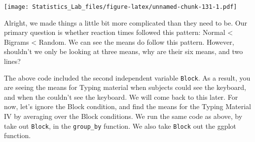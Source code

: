 \documentclass[
]{book}
\newenvironment{Shaded}{\begin{snugshade}}{\end{snugshade}}
\newcommand{\AttributeTok}[1]{\textcolor[rgb]{0.13,0.29,0.53}{#1}}
\newcommand{\CommentTok}[1]{\textcolor[rgb]{0.56,0.35,0.01}{\textit{#1}}}
\newcommand{\DecValTok}[1]{\textcolor[rgb]{0.00,0.00,0.81}{#1}}
\newcommand{\DocumentationTok}[1]{\textcolor[rgb]{0.56,0.35,0.01}{\textbf{\textit{#1}}}}
\newcommand{\FunctionTok}[1]{\textcolor[rgb]{0.13,0.29,0.53}{\textbf{#1}}}
\newcommand{\NormalTok}[1]{#1}
\newcommand{\OtherTok}[1]{\textcolor[rgb]{0.56,0.35,0.01}{#1}}
\newcommand{\SpecialCharTok}[1]{\textcolor[rgb]{0.81,0.36,0.00}{\textbf{#1}}}
\newcommand{\StringTok}[1]{\textcolor[rgb]{0.31,0.60,0.02}{#1}}
\begin{document}
\begin{Shaded}
\end{Shaded}

\texttt{[image: Statistics\_Lab\_files/figure-latex/unnamed-chunk-131-1.pdf]}

Alright, we made things a little bit more complicated than they need to be. Our primary question is whether reaction times followed this pattern: Normal \textless{} Bigrams \textless{} Random. We can see the means do follow this pattern. However, shouldn't we only be looking at three means, why are their six means, and two lines?

The above code included the second independent variable \texttt{Block}. As a result, you are seeing the means for Typing material when subjects could see the keyboard, and when the couldn't see the keyboard. We will come back to this later. For now, let's ignore the Block condition, and find the means for the Typing Material IV by averaging over the Block conditions. We run the same code as above, by take out \texttt{Block}, in the \texttt{group\_by} function. We also take \texttt{Block} out the ggplot function.
\end{document}
